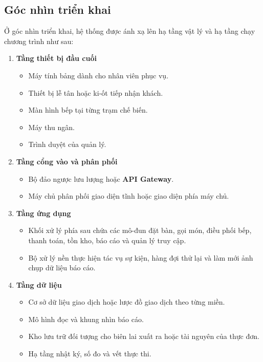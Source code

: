 \documentclass[11pt,a4paper]{article}
\begin{document}
\subsection{Góc nhìn triển khai}
Ở góc nhìn triển khai, hệ thống được ánh xạ lên hạ tầng vật lý và hạ tầng chạy chương trình như sau:

\begin{enumerate}
  \item \textbf{Tầng thiết bị đầu cuối}
  \begin{itemize}
    \item Máy tính bảng dành cho nhân viên phục vụ.
    \item Thiết bị lễ tân hoặc ki-ốt tiếp nhận khách.
    \item Màn hình bếp tại từng trạm chế biến.
    \item Máy thu ngân.
    \item Trình duyệt của quản lý.
  \end{itemize}

  \item \textbf{Tầng cổng vào và phân phối}
  \begin{itemize}
    \item Bộ đảo ngược lưu lượng hoặc \textbf{API Gateway}.
    \item Máy chủ phân phối giao diện tĩnh hoặc giao diện phía máy chủ.
  \end{itemize}

  \item \textbf{Tầng ứng dụng}
  \begin{itemize}
    \item Khối xử lý phía sau chứa các mô-đun đặt bàn, gọi món, điều phối bếp, thanh toán, tồn kho, báo cáo và quản lý truy cập.
    \item Bộ xử lý nền thực hiện tác vụ sự kiện, hàng đợi thử lại và làm mới ảnh chụp dữ liệu báo cáo.
  \end{itemize}

  \item \textbf{Tầng dữ liệu}
  \begin{itemize}
    \item Cơ sở dữ liệu giao dịch hoặc lược đồ giao dịch theo từng miền.
    \item Mô hình đọc và khung nhìn báo cáo.
    \item Kho lưu trữ đối tượng cho biên lai xuất ra hoặc tài nguyên của thực đơn.
    \item Hạ tầng nhật ký, số đo và vết thực thi.
  \end{itemize}
\end{enumerate}
\end{document}

